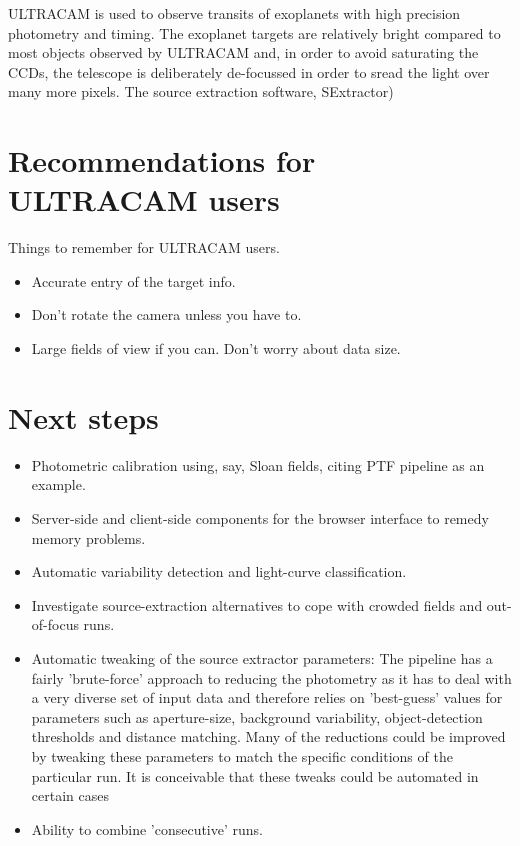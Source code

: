 ULTRACAM is used to observe transits of exoplanets with high precision photometry and timing. The exoplanet targets are relatively bright compared to most objects observed by ULTRACAM and, in order to avoid saturating the CCDs, the telescope is deliberately de-focussed in order to sread the light over many more pixels. The source extraction software, SExtractor) 
  
\section{Recommendations for ULTRACAM users}

Things to remember for ULTRACAM users. 
\begin{itemize}
	\item Accurate entry of the target info.
	\item Don't rotate the camera unless you have to.
	\item Large fields of view if you can. Don't worry about data size. 
\end{itemize} 

\section{Next steps}
\begin{itemize}
	\item Photometric calibration using, say, Sloan fields, citing PTF pipeline as an example.
	\item Server-side and client-side components for the browser interface to remedy memory problems.
	\item Automatic variability detection and light-curve classification. 
	\item Investigate source-extraction alternatives to cope with crowded fields and out-of-focus runs.
	\item Automatic tweaking of the source extractor parameters: The pipeline has a fairly 'brute-force' approach to reducing the photometry as it has to deal with a very diverse set of input data and therefore relies on 'best-guess' values for parameters such as aperture-size, background variability, object-detection thresholds and distance matching. Many of the reductions could be improved by tweaking these parameters to match the specific conditions of the particular run. It is conceivable that these tweaks could be automated in certain cases
	\item Ability to combine 'consecutive' runs. 
\end{itemize} 
 

